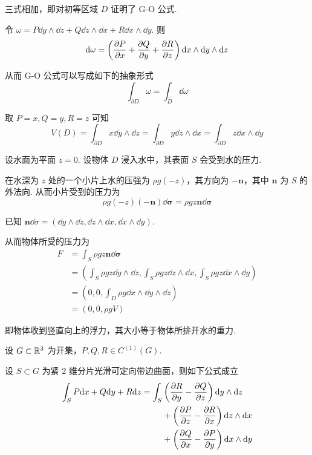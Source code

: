 三式相加，即对初等区域 $D$ 证明了 G-O 公式.

\begin{hint}
    令 $\omega=P\dd y\wedge\dd z+Q\dd z\wedge\dd x+R\dd x\wedge\dd y$. 则
$$
\mathrm{d}\omega=\left(\frac{\partial{P}}{\partial{x}}+\frac{\partial{Q}}{\partial{y}}+\frac{\partial{R}}{\partial{z}}\right)\mathrm{d} x\wedge\mathrm{d} y\wedge\mathrm{d} z
$$

    从而 G-O 公式可以写成如下的抽象形式
$$
\int_{\partial D}\omega=\int_{\overline{D}}\dd\omega
$$
\end{hint}

\begin{example}
    取 $P=x,Q=y,R=z$ 可知
$$
V(D)=\int_{\partial D}x\dd y\wedge\dd z=\int_{\partial D}y\dd z\wedge\dd x=\int_{\partial D}z\dd x\wedge\dd y
$$
\end{example}

\begin{example}[ 椭球的体积]
\end{example}

\begin{example}
    设水面为平面 $z=0$. 设物体 $D$ 浸入水中，其表面 $S$ 会受到水的压力.


    在水深为 $z$ 处的一个小片上水的压强为 $\rho g(-z)$，其方向为 $-\mathbf{n}$，其中 $\mathbf{n}$ 为 $S$ 的外法向. 从而小片受到的压力为
$$
\rho g(-z)(-\mathbf{n})\dd\bm{\sigma}=\rho gz\mathbf{n}\dd\bm{\sigma}
$$

    已知 $\mathbf{n}\dd\sigma=(\dd y\wedge\dd z,\dd z\wedge\dd x,\dd x\wedge\dd y)$.

    从而物体所受的压力为
$$
\begin{aligned}
    F&=\int_S\rho g z\mathbf{n}\dd\bm{\sigma}\\
    &=\left(\int_S\rho g z\dd y\wedge\dd z,\int_S\rho g z\dd z\wedge\dd x,\int_S\rho g z\dd x\wedge\dd y\right)\\
    &=\left(0,0,\int_D\rho g\dd x\wedge\dd y\wedge\dd z\right)\\
    &=(0,0,\rho g V)
\end{aligned}
$$

    即物体收到竖直向上的浮力，其大小等于物体所排开水的重力.
\end{example}


\begin{theorem}[Stokes 公式]
    设 $G\subset\mathbb{R}^3$ 为开集，$P,Q,R\in C^{(1)}(G)$.
    
    设 $S\subset G$ 为紧 $2$ 维分片光滑可定向带边曲面，则如下公式成立
$$
\begin{aligned}
    \int_SP\mathrm{d} x+Q\mathrm{d} y+R\mathrm{d} z=\int_S&\left(\frac{\partial{R}}{\partial{y}}-\frac{\partial{Q}}{\partial{z}}\right)\mathrm{d} y\wedge\mathrm{d} z\\
    &+\left(\frac{\partial{P}}{\partial{z}}-\frac{\partial{R}}{\partial{x}}\right)\mathrm{d} z\wedge\mathrm{d} x\\
    &+\left(\frac{\partial{Q}}{\partial{x}}-\frac{\partial{P}}{\partial{y}}\right)\mathrm{d} x\wedge\mathrm{d} y
\end{aligned}
$$
\end{theorem}

